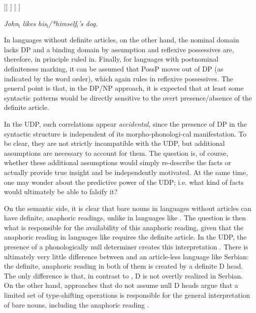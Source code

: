 \documentclass[output=paper,
modfonts
]{langscibook}
\begin{document}
	\ea \label{ex:despic:4}
	\ea 
	\begin{forest}
		[\textbf{DP}
		[\textbf{D}\\\textit{\textbf{the}}]
		[PossP
		[*Reflexive
		] 
		[Poss'[Poss
		][NP[{},roof]]]
		]
		]
		]
	\end{forest}
	
	\ex \textit{John\textnormal{$_\text{i}$} likes his\textnormal{$_\text{i}$}\textnormal{/*}himself\textnormal{$_\text{i}$}'s dog.}
	\z
	\z
	
	In languages without definite articles, on the other hand, the nominal domain lacks DP and a binding domain by assumption and reflexive possessives are, therefore, in principle ruled in. Finally, for languages with postnominal definiteness marking, it can be assumed that PossP moves out of DP (as indicated by the word order), which again rules in reflexive possessives.  The general point is that, in the DP/NP approach, it is expected that at least some syntactic patterns would be directly sensitive to the overt presence/absence of the definite article.  
	
	In the UDP, such correlations appear \textit{accidental}, since the presence of DP in the syntactic structure is independent of its morpho-phonologi\hyp{}cal manifestation.  To be clear, they are not strictly incompatible with the UDP, but additional assumptions are necessary to account for them. The question is, of course, whether these additional assumptions would simply re-describe the facts or actually provide true insight and be independently motivated.  At the same time, one may wonder about the predictive power of the UDP; i.e. what kind of facts would ultimately be able to falsify it?  
	
	On the semantic side, it is clear that bare nouns in languages without articles can have definite, anaphoric readings, unlike in languages like . The question is then what is responsible for the availability of this anaphoric reading, given that the anaphoric reading in languages like  requires the definite article. In the UDP, the presence of a phonologically null determiner creates this interpretation \citep[e.g.][]{Longobardi1994}. There is ultimately very little difference between  and an article-less language like Serbian: the definite, anaphoric reading in both of them is created by a definite D head. The only difference is that, in contrast to , D is not overtly realized in Serbian. On the other hand, approaches that do not assume null D heads argue that a limited set of type-shifting operations is responsible for the  general interpretation of bare nouns, including the anaphoric reading \citep[e.g.][]{Chierchia1998,Dayal2004}.  
	
\end{document}
